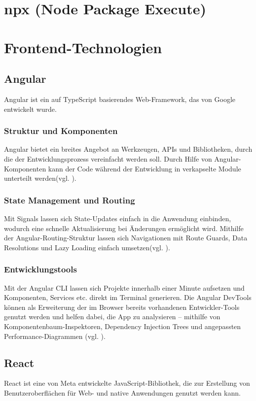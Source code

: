 \documentclass[oneside]{ausarbeitung}
\begin{document}
\section{npx (Node Package Execute)}

\section{Frontend-Technologien}

\subsection{Angular}
Angular ist ein auf TypeScript basierendes Web-Framework, das von Google entwickelt wurde. 

\subsubsection{Struktur und Komponenten}
Angular bietet ein breites Angebot an Werkzeugen, APIs und Bibliotheken, durch die der Entwicklungsprozess vereinfacht werden soll. Durch Hilfe von Angular-Komponenten kann der Code während der Entwicklung in verkapselte Module unterteilt werden(vgl. \parencite{angular}).

\subsubsection{State Management und Routing}
Mit Signals lassen sich State-Updates einfach in die Anwendung einbinden, wodurch eine schnelle Aktualisierung bei Änderungen ermöglicht wird. Mithilfe der Angular-Routing-Struktur lassen sich Navigationen mit Route Guards, Data Resolutions und Lazy Loading einfach umsetzen(vgl. \parencite{angular}).

\subsubsection{Entwicklungstools}
Mit der Angular CLI lassen sich Projekte innerhalb einer Minute aufsetzen und Komponenten, Services etc. direkt im Terminal generieren. Die Angular DevTools können als Erweiterung der im Browser bereits vorhandenen Entwickler-Tools genutzt werden und helfen dabei, die App zu analysieren – mithilfe von Komponentenbaum-Inspektoren, Dependency Injection Trees und angepassten Performance-Diagrammen (vgl. \parencite{angular}).

\subsection{React}
React ist eine von Meta entwickelte JavaScript-Bibliothek, die zur Erstellung von Benutzeroberflächen für Web- und native Anwendungen genutzt werden kann.
\end{document}

